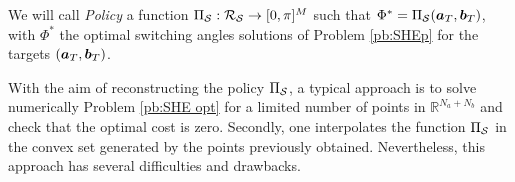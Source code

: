 \documentclass[twocolumn]{autart}    %
\begin{document}
\vspace{1em}
\begin{definition}[Policy]
We will call \textit{Policy} a function $\Pi_{\mathcal{S}}: \mathcal{R}_{\mathcal{S}} \rightarrow [0,\pi]^M$ such that $\Phi^* = \Pi_{\mathcal{S}}(\bm{a}_T,\bm{b}_T)$, with $\Phi^*$ the optimal switching angles solutions of Problem \ref{pb:SHEp} for the targets $(\bm{a}_T,\bm{b}_T)$.
\end{definition} 

With the aim of reconstructing the policy $\Pi_{\mathcal{S}}$, a typical approach is to solve numerically Problem \ref{pb:SHE opt} for a limited number of points in $\mathbb{R}^{N_a+N_b}$ and check that the optimal cost is zero. Secondly, one interpolates the function $\Pi_{\mathcal{S}}$ in the convex set generated by the points previously obtained. Nevertheless, this approach has several difficulties and drawbacks.
\end{document}
